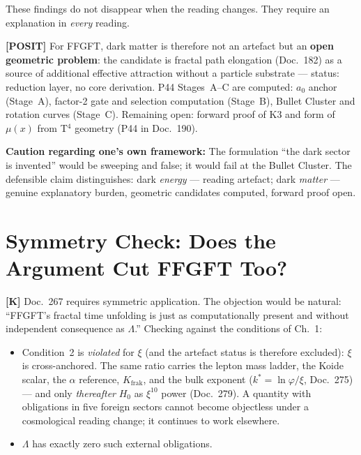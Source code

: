 These findings do not disappear when the reading changes. They require
an explanation in \emph{every} reading.

\medskip
\noindent\textbf{[POSIT]} For FFGFT, dark matter is therefore not an
artefact but an \textbf{open geometric problem}: the candidate is
fractal path elongation (Doc.~182) as a source of additional effective
attraction without a particle substrate — status: reduction layer, no
core derivation. P44 Stages~A–C are computed: $a_0$ anchor (Stage~A),
factor-2 gate and selection computation (Stage~B), Bullet Cluster and
rotation curves (Stage~C). Remaining open: forward proof of K3 and
form of $\mu(x)$ from T$^4$ geometry (P44 in Doc.~190).

\medskip
\noindent\textbf{Caution regarding one's own framework:} The formulation
``the dark sector is invented'' would be sweeping and false; it would
fail at the Bullet Cluster. The defensible claim distinguishes: dark
\emph{energy} — reading artefact; dark \emph{matter} — genuine
explanatory burden, geometric candidates computed, forward proof open.

\chapter{Symmetry Check: Does the Argument Cut FFGFT Too?}

\textbf{[K]} Doc.~267 requires symmetric application. The objection
would be natural: ``FFGFT's fractal time unfolding is just as
computationally present and without independent consequence as
$\Lambda$.'' Checking against the conditions of Ch.~1:

\begin{itemize}
  \item Condition~2 is \emph{violated} for $\xi$ (and the artefact
        status is therefore excluded): $\xi$ is cross-anchored.
        The same ratio carries the lepton mass ladder, the Koide scalar,
        the $\alpha$ reference, $K_\text{frak}$, and the bulk exponent
        ($k^* = \ln\varphi/\xi$, Doc.~275) — and only \emph{thereafter}
        $H_0$ as $\xi^{10}$ power (Doc.~279). A quantity with obligations
        in five foreign sectors cannot become objectless under a
        cosmological reading change; it continues to work elsewhere.
  \item $\Lambda$ has exactly zero such external obligations.
\end{itemize}

